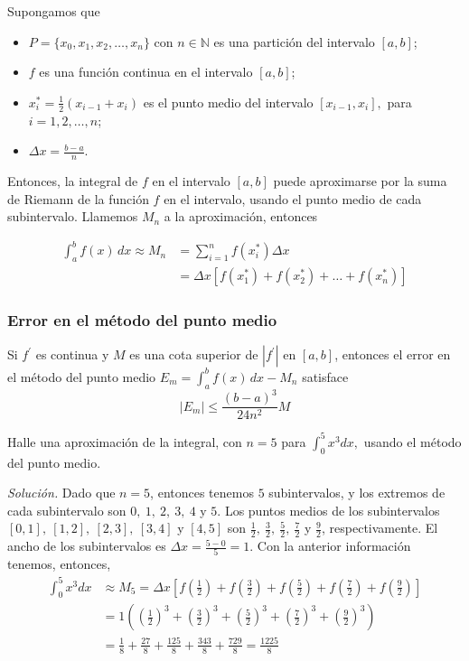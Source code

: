 Supongamos que
\begin{itemize}
  \item $P=\{x_0,x_1,x_2,\ldots,x_n \}$ con $n\in\mathbb{N}$ es una partición del intervalo $[a,b]$;
  \item $f$ es una función continua en el intervalo $[a,b]$;
  \item $x_{i}^{*}=\frac{1}{2}\left( x_{i-1}+x_{i}\right)$ es el punto medio del intervalo $[x_{i-1},x_{i}],$ para $i=1,2,\ldots,n$;
  \item $\Delta x=\frac{b-a}{n}$.
\end{itemize}

Entonces, la integral de $f$ en el intervalo $[a,b]$ puede aproximarse por la suma de Riemann de la función $f $ en el intervalo, usando el punto medio de cada subintervalo. Llamemos $M_{n}$ a la aproximación, entonces

\begin{align*}
  \int_{a}^{b}f(x)\,dx\approx M_{n}&=\sum\limits_{i=1}^{n}f(x_{i}^{*})\Delta x\\
  &=\Delta x[f(x_{1}^{* })+f(x_{2}^{*})+\ldots +f(x_{n}^{*})]
\end{align*}

\subsubsection{Error en el método del punto medio}

Si $f^{\prime}$ es continua y $M$ es una cota superior de $\left\vert
f^{\prime}\right\vert $ en $\left[ a,b\right] $, entonces el error en el método del punto medio {\small $E_{m}=\int_{a}^{b}f(x)\,dx-M_{n}$} satisface
\[
  \left\vert E_{m}\right\vert \leq \frac{\left( b-a\right) ^{3}}{24n^{2}}M
\]

\begin{ejemplo}
  Halle una aproximación de la integral, con $n=5$ para $\int_{0}^{5}x^{3}dx,$ usando el método del punto medio.
\end{ejemplo}

\emph{Solución.} Dado que $n=5$, entonces tenemos $5$ subintervalos, y los extremos de cada subintervalo son $0,\ 1,\ 2,\ 3,\ 4$ y $5$. Los puntos medios de los subintervalos $[0,1],\ [1,2],\ [2,3],\ [3,4]$ y $[4,5]$ son $\frac{1}{2},\ \frac{3}{2},\ \frac{5}{2},\ \frac{7}{2}$ y $\frac{9}{2}$, respectivamente. El ancho de los subintervalos es $\Delta x=\frac{5-0}{5}=1$. Con la anterior información tenemos, entonces,
\begin{align*}
  \int_{0}^{5}x^{3}dx &\approx M_{5}=\Delta x\left[f\left(\frac{1}{2}\right)+f\left(\frac{3}{2}\right)+f\left(\frac{5}{2}\right)+f\left(\frac{7}{2}\right)+f\left(\frac{9}{2}\right)\right] \\
  &=1\left( \left( \frac{1}{2}\right) ^{3}+\left( \frac{3}{2}\right)
    ^{3}+\left( \frac{5}{2}\right) ^{3}+\left( \frac{7}{2}\right) ^{3}+\left(
  \frac{9}{2}\right) ^{3}\right) \\
  &=\frac{1}{8}+\frac{27}{8}+\frac{125}{8}+\frac{343}{8}+\frac{729}{8}=\frac{1225}{8}
\end{align*}

